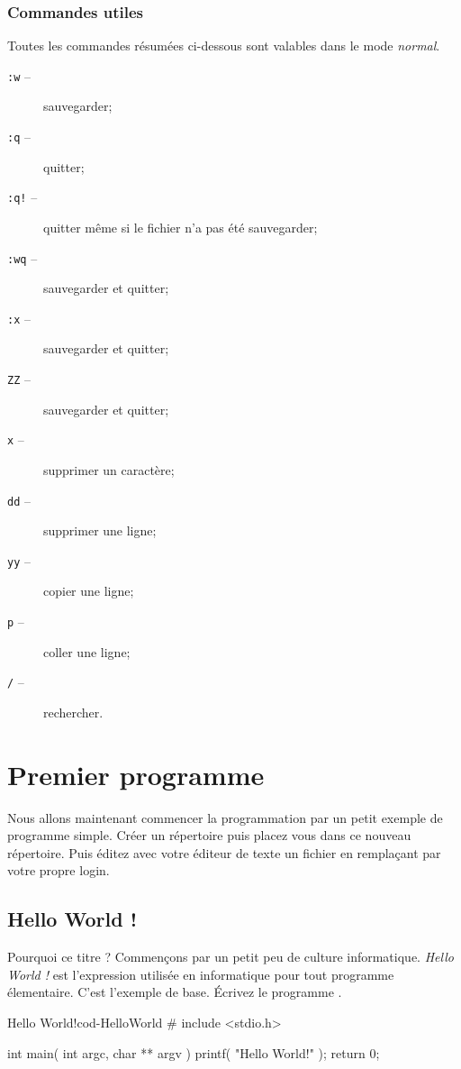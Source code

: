 \documentclass[a4paper]{article}
\begin{document}
			\subsubsection{Commandes utiles}
				Toutes les commandes résumées ci-dessous sont valables dans le mode \emph{normal}.
				\begin{description}
					\item[\texttt{:w} --] sauvegarder;
					\item[\texttt{:q} --] quitter;
					\item[\texttt{:q!} --] quitter même si le fichier n'a pas été sauvegarder;
					\item[\texttt{:wq} --] sauvegarder et quitter;
					\item[\texttt{:x} --] sauvegarder et quitter;
					\item[\texttt{ZZ} --] sauvegarder et quitter;
					\item[\texttt{x} --] supprimer un caractère;
					\item[\texttt{dd} --] supprimer une ligne;
					\item[\texttt{yy} --] copier une ligne;
					\item[\texttt{p} --] coller une ligne;
					\item[\texttt{/} --] rechercher.
				\end{description}
	\section{Premier programme}
		Nous allons maintenant commencer la programmation par un petit exemple de programme simple.
		Créer un répertoire  puis placez vous dans ce nouveau répertoire.
		Puis éditez avec votre éditeur de texte un fichier  en remplaçant  par votre propre login.
		\subsection{Hello World !}
			Pourquoi ce titre ?
			Commençons par un petit peu de culture informatique.
			\emph{Hello World !} est l'expression utilisée en informatique pour tout programme élementaire.
			C'est l'exemple de base.
			Écrivez le programme .
			\begin{Code}{Hello World!}{cod-HelloWorld}
# include <stdio.h>

int main( int argc, char ** argv )
{
	printf( "Hello World!" );
	return 0;	
}
			\end{Code}
\end{document}
